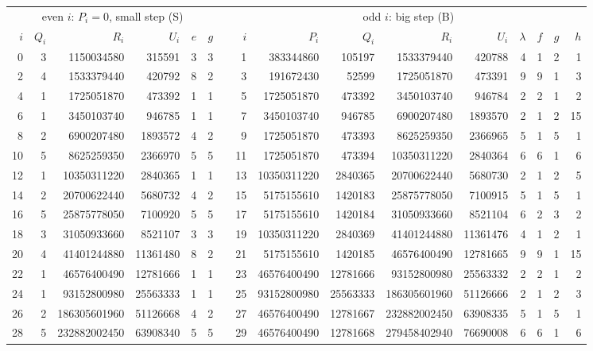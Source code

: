\documentclass[11pt]{amsart}
\theoremstyle{plain}
\theoremstyle{definition}
\begin{document}
\begin{table}[t]
\centering
\scriptsize
\setlength{\tabcolsep}{3.2pt}
\begin{tabular}{rrrrrrcrrrrrrrrr}
\multicolumn{6}{c}{even $i$: $P_i=0$, small step (S)} && \multicolumn{9}{c}{odd $i$: big step (B)}\\
$i$ & $Q_i$ & $R_i$ & $U_i$ & $e$ & $g$ && $i$ & $P_i$ & $Q_i$ & $R_i$ & $U_i$ & $\lambda$ & $f$ & $g$ & $h$\\\hline
0 & 3 & 1150034580 & 315591 & 3 & 3 && 1 & 383344860 & 105197 & 1533379440 & 420788 & 4 & 1 & 2 & 1 \\
2 & 4 & 1533379440 & 420792 & 8 & 2 && 3 & 191672430 & 52599 & 1725051870 & 473391 & 9 & 9 & 1 & 3 \\
4 & 1 & 1725051870 & 473392 & 1 & 1 && 5 & 1725051870 & 473392 & 3450103740 & 946784 & 2 & 2 & 1 & 2 \\
6 & 1 & 3450103740 & 946785 & 1 & 1 && 7 & 3450103740 & 946785 & 6900207480 & 1893570 & 2 & 1 & 2 & 15 \\
8 & 2 & 6900207480 & 1893572 & 4 & 2 && 9 & 1725051870 & 473393 & 8625259350 & 2366965 & 5 & 1 & 5 & 1 \\
10 & 5 & 8625259350 & 2366970 & 5 & 5 && 11 & 1725051870 & 473394 & 10350311220 & 2840364 & 6 & 6 & 1 & 6 \\
12 & 1 & 10350311220 & 2840365 & 1 & 1 && 13 & 10350311220 & 2840365 & 20700622440 & 5680730 & 2 & 1 & 2 & 5 \\
14 & 2 & 20700622440 & 5680732 & 4 & 2 && 15 & 5175155610 & 1420183 & 25875778050 & 7100915 & 5 & 1 & 5 & 1 \\
16 & 5 & 25875778050 & 7100920 & 5 & 5 && 17 & 5175155610 & 1420184 & 31050933660 & 8521104 & 6 & 2 & 3 & 2 \\
18 & 3 & 31050933660 & 8521107 & 3 & 3 && 19 & 10350311220 & 2840369 & 41401244880 & 11361476 & 4 & 1 & 2 & 1 \\
20 & 4 & 41401244880 & 11361480 & 8 & 2 && 21 & 5175155610 & 1420185 & 46576400490 & 12781665 & 9 & 9 & 1 & 15 \\
22 & 1 & 46576400490 & 12781666 & 1 & 1 && 23 & 46576400490 & 12781666 & 93152800980 & 25563332 & 2 & 2 & 1 & 2 \\
24 & 1 & 93152800980 & 25563333 & 1 & 1 && 25 & 93152800980 & 25563333 & 186305601960 & 51126666 & 2 & 1 & 2 & 3 \\
26 & 2 & 186305601960 & 51126668 & 4 & 2 && 27 & 46576400490 & 12781667 & 232882002450 & 63908335 & 5 & 1 & 5 & 1 \\
28 & 5 & 232882002450 & 63908340 & 5 & 5 && 29 & 46576400490 & 12781668 & 279458402940 & 76690008 & 6 & 6 & 1 & 6 \\

\end{tabular}
\end{table}
\end{document}
